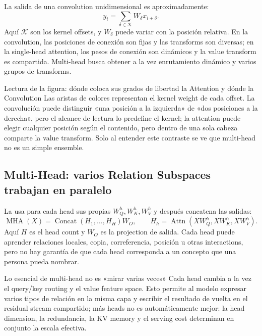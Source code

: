 La salida de una convolution unidimensional es aproximadamente:
\[
y_i=\sum_{\delta\in\mathcal{K}}W_{\delta}x_{i+\delta}.
\]
Aquí $\mathcal{K}$ son los kernel offsets, y $W_{\delta}$ puede variar con la posición relativa. En la convolution, las posiciones de conexión son fijas y las transforms son diversas; en la single-head attention, los pesos de conexión son dinámicos y la value transform es compartida. Multi-head busca obtener a la vez enrutamiento dinámico y varios grupos de transforms.


\begin{knowledgebox}{Lectura de la figura: dónde coloca sus grados de libertad la Attention y dónde la Convolution}
Las aristas de colores representan el kernel weight de cada offset. La convolución puede distinguir «una posición a la izquierda» de «dos posiciones a la derecha», pero el alcance de lectura lo predefine el kernel; la attention puede elegir cualquier posición según el contenido, pero dentro de una sola cabeza comparte la value transform. Solo al entender este contraste se ve que multi-head no es un simple ensemble.
\end{knowledgebox}

\subsection{Multi-Head: varios Relation Subspaces trabajan en paralelo}

La  usa para cada head sus propias $W_Q^h,W_K^h,W_V^h$ y después concatena las salidas:
\[
\operatorname{MHA}(X)=\operatorname{Concat}(H_1,\ldots,H_H)W_O,
\qquad H_h=\operatorname{Attn}(XW_Q^h,XW_K^h,XW_V^h).
\]
Aquí $H$ es el head count y $W_O$ es la projection de salida. Cada head puede aprender relaciones locales, copia, correferencia, posición u otras interactions, pero no hay garantía de que cada head corresponda a un concepto que una persona pueda nombrar.


\begin{importantbox}{Lo esencial de multi-head no es «mirar varias veces»}
Cada head cambia a la vez el query/key routing y el value feature space. Esto permite al modelo expresar varios tipos de relación en la misma capa y escribir el resultado de vuelta en el residual stream compartido; más heads no es automáticamente mejor: la head dimension, la redundancia, la KV memory y el serving cost determinan en conjunto la escala efectiva.
\end{importantbox}

